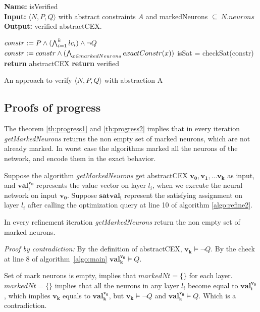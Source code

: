 \begin{algorithm}[t]
  \textbf{Name: } isVerified \\
  \textbf{Input: } $\langle N,P,Q \rangle$ with abstract constraints $A$ and markedNeurons $\subseteq ~ N.neurons$ \\
  \textbf{Output: } verified abstractCEX. 
  \begin{algorithmic}[1]
    \State $constr := P \land (\bigwedge_{i=1}^k lc_i)\land \neg Q$
    \State $constr := constr \land (\bigwedge_{x \in markedNeurons} exactConstr(x))$ 
    \State isSat = checkSat(constr)
      \State \textbf{return} abstractCEX
    \Else
      \State \textbf{return} verified
    \EndIf
  \end{algorithmic}
  \caption{An approach to verify $\langle N,P,Q \rangle$ with abstraction A}
  \label{algo:verif1}
\end{algorithm}


\subsection{Proofs of progress}
The theorem \ref{th:progress1} and \ref{th:progress2} implies that in every iteration {\em getMarkedNeurons} 
returns the non empty set of marked neurons, which are not already marked. In worst case the algorithms marked all 
the neurons of the network, and encode them in the exact behavior. 

Suppose the algorithm {\em getMarkedNeurons} get abstractCEX 
$\boldsymbol{v_0}, \boldsymbol{v_1}, ... \boldsymbol{v_k}$ as input, 
and $\boldsymbol{val_i^{\boldsymbol{v_0}}}$ represents the value vector on layer $l_i$, 
when we execute the neural network on input $\boldsymbol{v_0}$.
Suppose $\boldsymbol{satval_i}$ represent the satisfying assignment on layer $l_i$ after calling the optimization 
query at line 10 of algorithm \ref{algo:refine2}. 



\begin{theorem}
  \label{th:progress1}
  In every refinement iteration {\em getMarkedNeurons} return the non empty set of marked neurons. 
\end{theorem}

{\em Proof by contradiction:} 
By the definition of abstractCEX, $\boldsymbol{v_k} \models \lnot Q$. 
By the check at line 8 of algorithm~\ref{algo:main} $\boldsymbol{val_k^{\boldsymbol{v_0}}} \models Q$. 

Set of mark neurons is empty, implies that $markedNt = \{\}$ for each layer. 
$markedNt= \{\}$ implies that all the neurons in any layer $l_i$ become equal to $\boldsymbol{val_i^{\boldsymbol{v_0}}}$,  
which implies $\boldsymbol{v_k}$ equals to $\boldsymbol{val_k^{\boldsymbol{v_0}}}$, but $\boldsymbol{v_k} \models \lnot Q$ and 
$\boldsymbol{val_k^{\boldsymbol{v_0}}} \models Q$. Which is a contradiction. 


